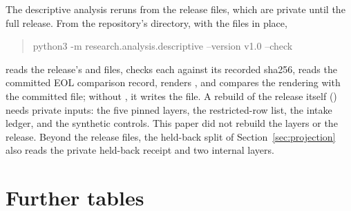 \documentclass[11pt]{article}
\begin{document}
The descriptive analysis reruns from the release files, which are private until the full release. From the repository's 
directory, with the files in place,
\begin{quote}\small\ttfamily python3 -m research.analysis.descriptive --version v1.0 --check\end{quote}
reads the release's  and  files, checks each against its recorded sha256,
reads the committed EOL comparison record, renders , and compares the rendering
with the committed file; without , it writes the file. A rebuild of the release
itself () needs private inputs: the five pinned layers, the
restricted-row list, the intake ledger, and the synthetic controls. This paper did not rebuild the
layers or the release. Beyond the release files, the held-back split of
Section~\ref{sec:projection} also reads the private held-back receipt and two internal layers.

\renewcommand{\bibfont}{\small\raggedright}



\appendix

\section{Further tables}
\label{app:tables}

\begin{table}[htbp]
\centering
\caption{Coverage by Zipf band (\%), weighted by wordfreq's frequency estimate.}
\small

\end{table}

\begin{table}[htbp]
\centering
\caption{The union of listed single-token rows as lists are added in every order.}
\small

\end{table}

\begin{table}[htbp]
\centering
\caption{The EOL's synthetic engine: rows by the method inferred from their form.}
\small

\end{table}

\begin{table}[htbp]
\centering
\caption{Rows by intake layer and kind, and by evidence tier.}
\small
\resizebox{\linewidth}{!}{}
\end{table}
\end{document}
